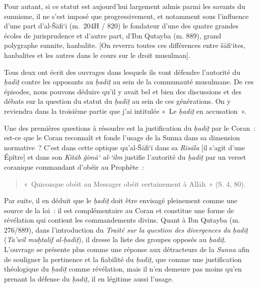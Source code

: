 

Pour autant, si ce statut est aujourd'hui largement admis parmi les
savants du sunnisme, il ne s'est imposé que progressivement, et
notamment sous l'influence d'une part d'al-Šāfi`ī (m.~204H / 820) le
fondateur d'une des quatre grandes écoles de jurisprudence et d'autre
part, d'Ibn Qutayba (m. 889), grand polygraphe sunnite, hanbalite. {[}On
reverra toutes ces différences entre šāfi`ites, hanbalites et les autres
dans le cours sur le droit musulman{]}.

Tous deux ont écrit des ouvrages dans lesquels ils vont défendre
l'autorité du \emph{ḥadīṯ} contre les opposants au \emph{ḥadīṯ} au sein
de la communauté musulmane. De ces épisodes, nous pouvons déduire qu'il
y avait bel et bien des discussions et des débats sur la question du
statut du \emph{ḥadīṯ} au sein de ces générations. On y reviendra dans
la troisième partie que j'ai intitulée «~Le \emph{ḥadīṯ} en
accusation~».

Une des premières questions à résoudre est la justification du
\emph{ḥadīṯ} par le Coran~: est-ce que le Coran reconnaît et fonde
l'usage de la Sunna dans sa dimension normative~? C'est dans cette
optique qu'al-Šāfi`ī dans sa \emph{Risāla} {[}il s'agit d'une Épître{]}
et dans son \emph{Kitāb ǧimā` al-`ilm} justifie l'autorité du
\emph{ḥadīṯ} par un verset coranique commandant d'obéir au Prophète~:
\begin{quote}
    «~Quiconque obéit au Messager obéit certainement à Allāh~» (S. 4, 80).


\end{quote}

Par suite, il en déduit que le \emph{ḥadīṯ} doit être envisagé
pleinement comme une source de la loi~: il est complémentaire au Coran
et constitue une forme de révélation qui contient les commandements
divins. Quant à Ibn Qutayba (m. 276/889), dans l'introduction du
\emph{Traité sur la question des divergences du} \emph{ḥadīṯ}
(\emph{Ta'wīl muḫtalif al-ḥadīṯ}), il dresse la liste des groupes opposés au \emph{ḥadīṯ}.
L'ouvrage se présente plus comme une réponse aux détracteurs de la
\emph{Sunna} afin de souligner la pertinence et la fiabilité du
\emph{ḥadīṯ}, que comme une justification théologique du \emph{ḥadīṯ}
comme révélation, mais il n'en demeure pas moins qu'en prenant la
défense du \emph{ḥadīṯ}, il en légitime aussi l'usage.

